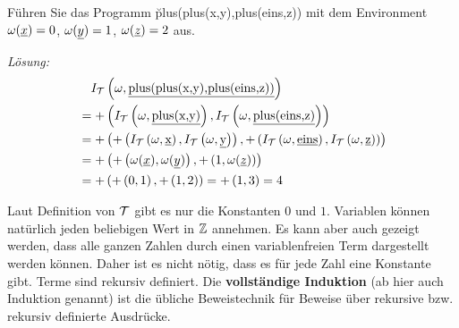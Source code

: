 \begin{bsp}
Führen Sie das Programm \u{plus(plus(x,y),plus(eins,z))} mit dem Environment $\omega(\underline{x})=0$, $\omega(\underline{y})=1$, $\omega(\underline{z})=2$ aus.

\textit{Lösung:}
\begin{align*}
&\quad I_{\mathcal{T}}\left(\omega,\text{\underline{plus(plus(x,y),plus(eins,z))}}\right)\\
&= +\left(I_{\mathcal{T}}\left(\omega,\text{\underline{plus(x,y)}}\right),I_{\mathcal{T}}\left(\omega,\text{\underline{plus(eins,z)}}\right)\right) \\
&= +\left(+\left(I_{\mathcal{T}}\left(\omega,\text{\underline{x}}\right),I_{\mathcal{T}}\left(\omega,\text{\underline{y}}\right)\right),+\left(I_{\mathcal{T}}\left(\omega,\text{\underline{eins}}\right),I_{\mathcal{T}}\left(\omega,\text{\underline{z}}\right)\right)\right) \\
&= +\left(+\left(\omega(\underline{x}),\omega(\underline{y})\right),+\left(1,\omega(\underline{z})\right)\right) \\
&= +\left(+\left(0,1\right),+\left(1,2\right)\right) = +\left(1,3\right) = 4
\end{align*}
\end{bsp}

Laut Definition von $\mathcal{T}$ gibt es nur die Konstanten $0$ und $1$. Variablen können natürlich jeden beliebigen Wert in $\mathbb{Z}$ annehmen.
Es kann aber auch gezeigt werden, dass alle ganzen Zahlen durch einen variablenfreien Term dargestellt werden können. Daher ist es nicht nötig, dass es für jede Zahl eine Konstante gibt.
Terme sind rekursiv definiert. Die \textbf{vollständige Induktion} (ab hier auch Induktion genannt) ist die übliche Beweistechnik für Beweise über rekursive bzw. rekursiv definierte Ausdrücke.

